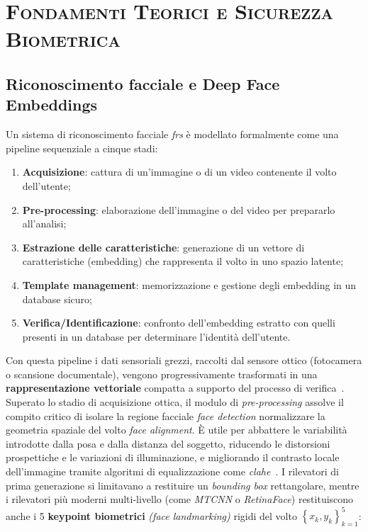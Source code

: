 \chapter{\scshape Fondamenti Teorici e Sicurezza Biometrica}
\label{cap:1-fondamenti}
\section{Riconoscimento facciale e Deep Face Embeddings}
\label{cap:1.1-fondamenti}
Un  sistema di riconoscimento facciale \textit{\gls{frs}} è modellato formalmente come una pipeline sequenziale a cinque stadi:
\begin{enumerate}
    \item \textbf{Acquisizione}: cattura di un'immagine o di un video contenente il volto dell'utente;
    \item \textbf{Pre-processing}: elaborazione dell'immagine o del video per prepararlo all'analisi;
    \item \textbf{Estrazione delle caratteristiche}: generazione di un vettore di caratteristiche (embedding) che rappresenta il volto in uno spazio latente;
    \item \textbf{Template management}: memorizzazione e gestione degli embedding in un database sicuro;
    \item \textbf{Verifica/Identificazione}: confronto dell'embedding estratto con quelli presenti in un database per determinare l'identità dell'utente.
\end{enumerate}
Con questa pipeline i dati sensoriali grezzi, raccolti dal sensore ottico (fotocamera o scansione documentale), vengono progressivamente trasformati in una \textbf{rappresentazione vettoriale} compatta a supporto del processo di verifica~\cite{sanzGoverningPrivacyPreservingFace2026}.
Superato lo stadio di acquisizione ottica, il modulo di \textit{pre-processing} assolve il compito critico di isolare la regione facciale \textit{face detection} normalizzare la geometria spaziale del volto \textit{face alignment}. 
È utile per abbattere le variabilità introdotte dalla posa e dalla distanza del soggetto, riducendo le distorsioni prospettiche e le variazioni di illuminazione, e migliorando il contrasto locale dell'immagine tramite algoritmi di equalizzazione come \textit{\gls{clahe}}~\cite{rezaRealizationContrastLimited2004}.
I rilevatori di prima generazione si limitavano a restituire un \textit{bounding box} rettangolare, mentre i rilevatori più moderni multi-livello (come \textit{MTCNN} o \textit{RetinaFace}) restituiscono anche i 5 \textbf{keypoint biometrici} \textit{(face landmarking)} rigidi del volto $\left\{x_k, y_k\right\}_{k=1}^{5}$:
